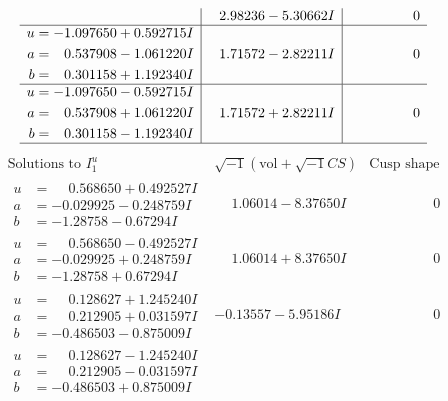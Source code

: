 \documentclass[1p]{elsarticle_modified}
\theoremstyle{definition}
\newcommand{\I}{\sqrt{-1}}
\begin{document}
$$\begin{array}{c|c|c}
 & \phantom{-}2.98236 - 5.30662 I & \phantom{-0.000000 } 0 \\ \hline\begin{aligned}
u &= -1.097650 + 0.592715 I \\
a &= \phantom{-}0.537908 - 1.061220 I \\
b &= \phantom{-}0.301158 + 1.192340 I\end{aligned}
 & \phantom{-}1.71572 - 2.82211 I & \phantom{-0.000000 } 0 \\ \hline\begin{aligned}
u &= -1.097650 - 0.592715 I \\
a &= \phantom{-}0.537908 + 1.061220 I \\
b &= \phantom{-}0.301158 - 1.192340 I\end{aligned}
 & \phantom{-}1.71572 + 2.82211 I & \phantom{-0.000000 } 0\\
 \hline 
 \end{array}$$\newpage$$\begin{array}{c|c|c}  
\text{Solutions to }I^u_{1}& \I (\text{vol} + \sqrt{-1}CS) & \text{Cusp shape}\\
 \hline 
\begin{aligned}
u &= \phantom{-}0.568650 + 0.492527 I \\
a &= -0.029925 - 0.248759 I \\
b &= -1.28758 - 0.67294 I\end{aligned}
 & \phantom{-}1.06014 - 8.37650 I & \phantom{-0.000000 } 0 \\ \hline\begin{aligned}
u &= \phantom{-}0.568650 - 0.492527 I \\
a &= -0.029925 + 0.248759 I \\
b &= -1.28758 + 0.67294 I\end{aligned}
 & \phantom{-}1.06014 + 8.37650 I & \phantom{-0.000000 } 0 \\ \hline\begin{aligned}
u &= \phantom{-}0.128627 + 1.245240 I \\
a &= \phantom{-}0.212905 + 0.031597 I \\
b &= -0.486503 - 0.875009 I\end{aligned}
 & -0.13557 - 5.95186 I & \phantom{-0.000000 } 0 \\ \hline\begin{aligned}
u &= \phantom{-}0.128627 - 1.245240 I \\
a &= \phantom{-}0.212905 - 0.031597 I \\
b &= -0.486503 + 0.875009 I\end{aligned}

\end{array}$$
\end{document}

